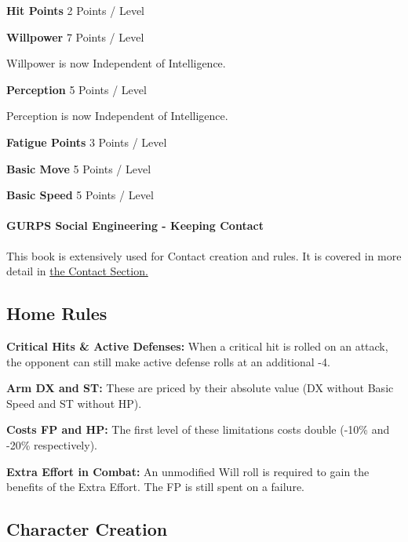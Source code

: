 \begin{multicols*}{3}
	\noindent\newline\textbf{Hit Points}
	2 Points / Level
	
	\noindent\newline\textbf{Willpower }
	7 Points / Level
	
	\noindent
	Willpower is now Independent of Intelligence.
	
	\noindent\newline\textbf{Perception}
	5 Points / Level
	
	\noindent
	Perception is now Independent of Intelligence.
	
	\noindent\newline\textbf{Fatigue Points}
	3 Points / Level
	
	\noindent\newline\textbf{Basic Move}
	5 Points / Level
	
	\noindent\newline\textbf{Basic Speed}
	5 Points / Level
	
	\paragraph{GURPS Social Engineering - Keeping Contact}
	
	This book is extensively used for Contact creation and rules. It is covered in more detail in \hyperref[Contacts]{the Contact Section.}
	
	\subsection{Home Rules}
	
	\textbf{Critical Hits \& Active Defenses:} When a critical hit is rolled on an attack, the opponent can still make active defense rolls at an additional -4.
	
	\textbf{Arm DX and ST:} These are priced by their absolute value (DX without Basic Speed and ST without HP).
	
	\textbf{Costs FP and HP:} The first level of these limitations costs double (-10\% and -20\% respectively).
	
	\textbf{Extra Effort in Combat:} An unmodified Will roll is required to gain the benefits of the Extra Effort. The FP is still spent on a failure.
	
	\subsection{Character Creation}
	

\end{multicols*}
